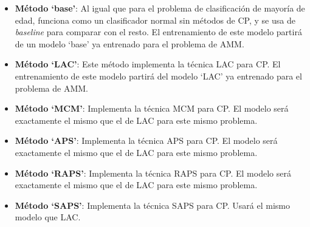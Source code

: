 \begin{itemize}

    \item \textbf{Método `base'}: Al igual que para el problema de clasificación de mayoría de edad, funciona como un clasificador normal sin métodos de CP, y se usa de \textit{baseline} para comparar con el resto. El entrenamiento de este modelo partirá de un modelo `base' ya entrenado para el problema de AMM.

    \item \textbf{Método `LAC'}: Este método implementa la técnica LAC para CP. El entrenamiento de este modelo partirá del modelo `LAC' ya entrenado para el problema de AMM.

    \item \textbf{Método `MCM'}: Implementa la técnica MCM para CP. El modelo será exactamente el mismo que el de LAC para este mismo problema. 

    \item \textbf{Método `APS'}: Implementa la técnica APS para CP. El modelo será exactamente el mismo que el de LAC para este mismo problema.

    \item \textbf{Método `RAPS'}: Implementa la técnica RAPS para CP. El modelo será exactamente el mismo que el de LAC para este mismo problema. 
    
    \item \textbf{Método `SAPS'}: Implementa la técnica SAPS para CP. Usará el mismo modelo que LAC. 

\end{itemize} 

